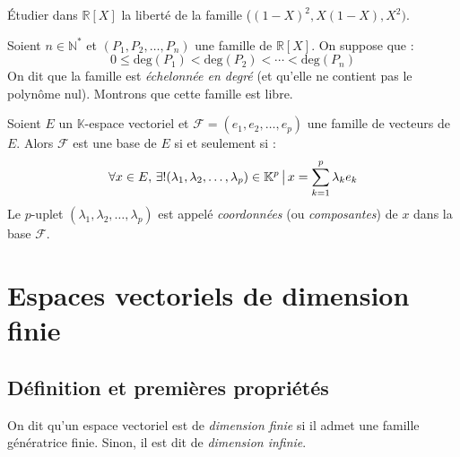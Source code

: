 \documentclass[a4paper,10pt]{report}
\begin{document}
\begin{ApplicationDirecte} Étudier dans $\mathbb{R}[X]$ la liberté de la famille ($(1-X)^2,X(1-X),X^2)$.
\end{ApplicationDirecte}
\begin{Exemple} Soient $n \in \mathbb{N}^*$ et $(P_1, P_2, \ldots, P_n)$ une famille de $\mathbb{R}[X]$. On suppose que :
$$ 0 \leq \textrm{deg}(P_1) < \textrm{deg}(P_2) < \cdots < \textrm{deg}(P_n)$$
On dit que la famille est \emph{échelonnée en degré} (et qu'elle ne contient pas le polynôme nul). Montrons que cette famille est libre.

\medskip
%
%

\vspace{9cm}
\end{Exemple}

\begin{TheoremeDefinition}{} 
Soient $E$ un $\mathbb{K}$-espace vectoriel et $\mathcal{F} = (e_1, e_2, \ldots, e_p)$ une famille de vecteurs de $E$. Alors $\mathcal{F}$ est une base de $E$ si et seulement si :
$$ \forall x \in E, \, \exists  ! (\lambda_1, \lambda_2, \ldots, \lambda_p) \in \mathbb{K}^p \, \big{\vert} \, x = \sum_{k=1}^p \lambda_k e_k$$
Le $p$-uplet $(\lambda_1, \lambda_2, \ldots, \lambda_p)$ est appelé \emph{coordonnées} (ou \emph{composantes}) de $x$ dans la base $\mathcal{F}$.
\end{TheoremeDefinition}

\section{Espaces vectoriels de dimension finie}
 \subsection{Définition et premières propriétés}
 \begin{Definition}{} On dit qu'un espace vectoriel est de \emph{dimension finie} si il admet une famille génératrice finie. Sinon, il est dit de \emph{dimension infinie}.
 \end{Definition}
 
\end{document}
